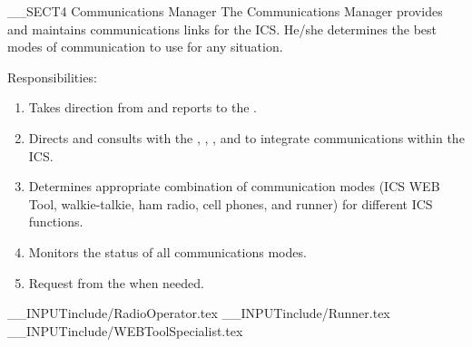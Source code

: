 __SECT4{ \large Communications Manager
\label{sec:CommunicationsManager} }
The Communications Manager provides and maintains 
communications links for the ICS.
He/she determines the best modes of communication to use for any situation.

Responsibilities:
\begin{enumerate}
\item Takes direction from and reports to the \LogisticsSectionChief.
\item Directs and consults with the \RadioOperator, \WEBToolSpecialist, \HamRadioOperator, and \Runners to integrate communications within the ICS.
\item Determines appropriate combination of communication modes (ICS WEB Tool, walkie-talkie, ham radio, cell phones, and runner) for different ICS functions.
\item Monitors the status of all communications modes.
\item Request \Runners from the \LogisticsSectionChief when needed.
\end{enumerate}

__INPUT{include/RadioOperator.tex}
__INPUT{include/Runner.tex}
__INPUT{include/WEBToolSpecialist.tex}


